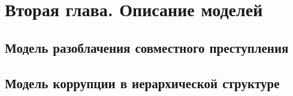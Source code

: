 \chapter{Вторая глава. Описание моделей}
\label{cha:ch_2}
\section{Модель разоблачения совместного преступления}

\section{Модель коррупции в иерархической структуре}
